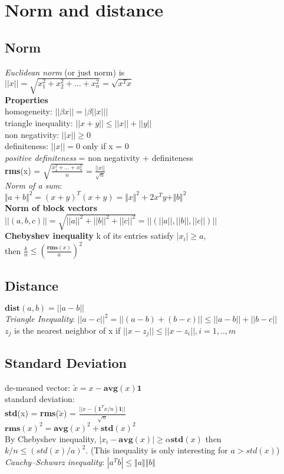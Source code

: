 \section{Norm and distance}
\subsection{Norm} 
\textit{Euclidean norm} (or just norm) is\\
$||x||= \sqrt{x_1^2+x_2^2+...+x_n^2}= \sqrt{x^Tx}$\\
\textbf{Properties}\\
\textbullet homogeneity: $||\beta x|| = |\beta ||x|||$\\
\textbullet triangle inequality: $||x + y|| \leq ||x|| + ||y||$\\
\textbullet non negativity: $||x|| \geq 0$\\
\textbullet definiteness: $||x|| = 0$ only if x = 0\\
\textit{positive definiteness} = non negativity + definiteness\\
\textbf{rms}(x) = $\sqrt{\frac{x_1^2+...+x_n^2}{n}} = \frac{||x||}{\sqrt{n}}$ \\
\textbullet \textit{Norm of a sum}:\\ 
$\Vert a + b \Vert^2 = (x + y)^T(x + y) = \Vert x \Vert^2 + 2x^Ty + \Vert b \Vert^2$\\
\textbf{Norm of block vectors}
$||(a,b,c)|| = \sqrt{||a||^2 + ||b||^2 + ||c||^2} = ||(||a||, ||b||, ||c||)||$\\
\textbf{Chebyshev inequality}
k of its entries satisfy $|x_i| \geq a$, \\then $\frac{k}{n} \leq (\frac{\textbf{rms}(x)}{a})^2$
\subsection{Distance}
$\textbf{dist}(a,b) = ||a - b||$\\
\textit{Triangle Inequality}: $||a - c||^2 = ||(a - b) + (b - c)|| \leq ||a-b|| + ||b-c||$\\
$z_j$ is the nearest neighbor of x if $||x-z_j|| \leq ||x-z_i||, i=1,..,m$\\

\subsection{Standard Deviation}
de-meaned vector: $\tilde{x} = x - \textbf{avg}(x)\textbf{1}$\\
standard deviation: \\\textbf{std}(x) = \textbf{rms}($\tilde{x}$) = $\frac{||x - (\textbf{1}^Tx/n)\textbf{1}||}{\sqrt{n}}$\\
${\textbf{rms}(x)}^2 = {\textbf{avg}(x)}^2 + {\textbf{std}(x)}^2$\\
By Chebyshev inequality, $|x_i - \textbf{avg}(x)| \geq \alpha \textbf{std}(x)$ then $k/n \leq (std(x)/a)^2$. (This inequality is only interesting for $a > std(x)$) \\
\textit{Cauchy–Schwarz inequality}: $|a^Tb| \leq \Vert a\Vert \Vert b \Vert$
